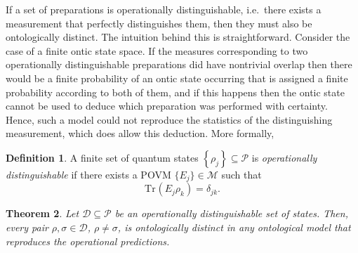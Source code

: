 \documentclass[DIV=calc,paper=a4,fontsize=11pt,twocolumn]{scrartcl} %
\theoremstyle{definition}
\newtheorem{definition}{Definition}[section]
\theoremstyle{plain}
\newtheorem{theorem}[definition]{Theorem}
\newcommand{\Tr}[2][]{\ensuremath{\text{Tr}_{#1} \left ( #2 \right )}}
\begin{document}
If a set of preparations is operationally distinguishable, i.e.\ there
exists a measurement that perfectly distinguishes them, then they must
also be ontologically distinct.  The intuition behind this is
straightforward.  Consider the case of a finite ontic state space.  If
the measures corresponding to two operationally distinguishable
preparations did have nontrivial overlap then there would be a finite
probability of an ontic state occurring that is assigned a finite
probability according to both of them, and if this happens then the
ontic state cannot be used to deduce which preparation was performed
with certainty.  Hence, such a model could not reproduce the
statistics of the distinguishing measurement, which does allow this
deduction.  More formally,
\begin{definition}
A finite set of quantum states $\left \{ \rho_j \right \} \subseteq
\mathcal{P}$ is \emph{operationally distinguishable} if there exists
a POVM $\{E_j\} \in \mathcal{M}$ such that
\begin{equation}
\Tr{E_j \rho_k} = \delta_{jk}.
\end{equation}
\end{definition}
\begin{theorem}
\label{prop:POEM:distinguish}
Let $\mathcal{D} \subseteq \mathcal{P}$ be an operationally
distinguishable set of states.  Then, every pair $\rho, \sigma \in
\mathcal{D}$, $\rho \neq \sigma$, is ontologically distinct in any
ontological model that reproduces the operational predictions.
\end{theorem}
\end{document}
